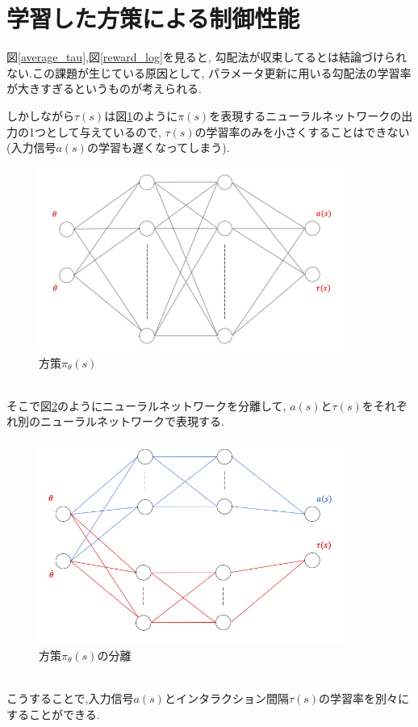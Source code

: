 \documentclass{jsarticle}
\begin{document}
\section{学習した方策による制御性能}
図\ref{average_tau},図\ref{reward_log}を見ると, 勾配法が収束してるとは結論づけられない.この課題が生じている原因として, パラメータ更新に用いる勾配法の学習率が大きすぎるというものが考えられる.\par
しかしながら$\tau(s)$は図\ref{actor_NN}のように$\pi(s)$を表現するニューラルネットワークの出力の1つとして与えているので, $\tau(s)$の学習率のみを小さくすることはできない(入力信号$a(s)$の学習も遅くなってしまう).
\begin{figure}[h]
	\centering
 	\includegraphics[width=10cm]{actor_NN.png}
 	\caption{方策$\pi_{\theta}(s)$}  \label{actor_NN}
\end{figure}\\
そこで図\ref{split_NN}のようにニューラルネットワークを分離して, $a(s)と\tau(s)$をそれぞれ別のニューラルネットワークで表現する.
\begin{figure}[h]
	\centering
 	\includegraphics[width=10cm]{split_NN.png}
 	\caption{方策$\pi_{\theta}(s)$の分離}  \label{split_NN}
\end{figure}\\
こうすることで,入力信号$a(s)$とインタラクション間隔$\tau(s)$の学習率を別々にすることができる.\par
\end{document}
